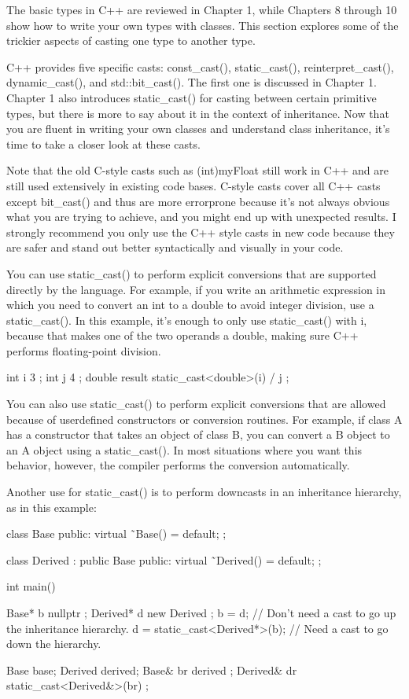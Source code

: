 
The basic types in C++ are reviewed in Chapter 1, while Chapters 8 through 10 show how to write your own types with classes. This section explores some of the trickier aspects of casting one type to another type.

C++ provides five specific casts: const\_cast(), static\_cast(), reinterpret\_cast(), dynamic\_cast(), and std::bit\_cast(). The first one is discussed in Chapter 1. Chapter 1 also introduces static\_cast() for casting between certain primitive types, but there is more to say about it in the context of inheritance. Now that you are fluent in writing your own classes and understand class inheritance, it’s time to take a closer look at these casts.

Note that the old C-style casts such as (int)myFloat still work in C++ and are still used extensively in existing code bases. C-style casts cover all C++ casts except bit\_cast() and thus are more errorprone because it’s not always obvious what you are trying to achieve, and you might end up with unexpected results. I strongly recommend you only use the C++ style casts in new code because they are safer and stand out better syntactically and visually in your code.


You can use static\_cast() to perform explicit conversions that are supported directly by the language. For example, if you write an arithmetic expression in which you need to convert an int to a double to avoid integer division, use a static\_cast(). In this example, it’s enough to only use static\_cast() with i, because that makes one of the two operands a double, making sure C++ performs floating-point division.

\begin{cpp}
int i { 3 };
int j { 4 };
double result { static_cast<double>(i) / j };
\end{cpp}

You can also use static\_cast() to perform explicit conversions that are allowed because of userdefined constructors or conversion routines. For example, if class A has a constructor that takes an object of class B, you can convert a B object to an A object using a static\_cast(). In most situations where you want this behavior, however, the compiler performs the conversion automatically.

Another use for static\_cast() is to perform downcasts in an inheritance hierarchy, as in this example:

\begin{cpp}
class Base
{
    public:
        virtual ˜Base() = default;
};

class Derived : public Base
{
    public:
        virtual ˜Derived() = default;
};

int main()
{
    Base* b { nullptr };
    Derived* d { new Derived {} };
    b = d; // Don't need a cast to go up the inheritance hierarchy.
    d = static_cast<Derived*>(b); // Need a cast to go down the hierarchy.

    Base base;
    Derived derived;
    Base& br { derived };
    Derived& dr { static_cast<Derived&>(br) };
}
\end{cpp}

